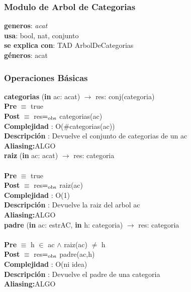 \documentclass[10pt, a4paper]{article}
\begin{document}
\subsubsection{\Large Modulo de Arbol de Categorias\\}
	\textbf{generos}: \textit{acat}\\
	\textbf{usa}: bool, nat, conjunto\\
		\textbf{se explica con}: TAD ArbolDeCategorias\\
		\textbf{g\'eneros}: acat\\

\subsubsection{\Large Operaciones B\'asicas}
	\textbf{categorias} (\textbf{in} ac: acat) $\longrightarrow$ res: conj(categoria)\\
	\textbf{Pre} $\equiv$ {true}\\
	\textbf{Post} $\equiv$ {res$=_{\mathrm{obs}}$ categorias(ac)}\\
	\textbf{Complejidad} : O($\#$categorias(ac))\\
	\textbf{Descripci\'{o}n} : Devuelve el conjunto de categorias de un ac\\
	\textbf{Aliasing:}ALGO \\
	
	\textbf{raiz} (\textbf{in} ac: acat) $\longrightarrow$ res: categoria\\\\
	\textbf{Pre} $\equiv$ {true}\\
	\textbf{Post} $\equiv$ {res$=_{\mathrm{obs}}$ raiz(ac)}\\
	\textbf{Complejidad} : O(1)\\
	\textbf{Descripci\'{o}n} : Devuelve la raiz del arbol ac\\
	\textbf{Aliasing:}ALGO \\
	
	\textbf{padre} (\textbf{in} ac: estrAC, \textbf{in} h: categoria) $\longrightarrow$ res: categoria\\\\
	\textbf{Pre} $\equiv$ {h $\in$ ac $\wedge$ raiz(ac) $\neq$ h}\\
	\textbf{Post} $\equiv$ {res$=_{\mathrm{obs}}$ padre(ac,h)}\\
	\textbf{Complejidad} : O(ni idea)\\
	\textbf{Descripci\'{o}n} : Devuelve el padre de una categoria\\
	\textbf{Aliasing:}ALGO \\
		
\end{document}
